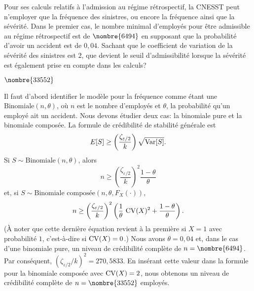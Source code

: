 \begin{exercice}
  Pour ses calculs relatifs à l'admission au régime rétrospectif, la
  CNESST peut n'employer que la fréquence des sinistres, ou encore la
  fréquence ainsi que la sévérité. Dans le premier cas, le nombre
  minimal d'employés pour être admissible au régime rétrospectif est
  de $\nombre{6494}$ en supposant que la probabilité d'avoir un accident
  est de $0,04$.  Sachant que le coefficient de variation de la sévérité
  des sinistres est $2$, que devient le seuil d'admissibilité
  lorsque la sévérité est également prise en compte dans les calculs?
  \begin{rep}
    $\nombre{33552}$
  \end{rep}
  \begin{sol}
    Il faut d'abord identifier le modèle pour la fréquence comme étant
    une $\text{Binomiale}(n, \theta)$, où $n$ est le nombre d'employés
    et $\theta$, la probabilité qu'un employé ait un accident. Nous
    devons étudier deux cas: la binomiale pure et la binomiale
    composée. La formule de crédibilité de stabilité générale est
    \begin{equation*}
      E [ S ] \geq
      \left(
        \frac{\zeta_{\varepsilon/2}}{k}
      \right) \sqrt{\operatorname{Var} [ S ]}.
    \end{equation*}
    Si $S \sim \text{Binomiale}(n, \theta)$, alors
    \begin{equation*}
      n \geq
      \left(
        \frac{\zeta_{\varepsilon/2}}{k}
      \right)^2 \frac{1 - \theta}{\theta}
    \end{equation*}
    et, si $S \sim \text{Binomiale composée}(n, \theta, F_X(\cdot))$,
    \begin{equation*}
      n \geq
      \left(
        \frac{\zeta_{\varepsilon/2}}{k}
      \right)^2
      \left(
        \frac{1}{\theta}\, \operatorname{CV}(X)^2 +
        \frac{1 - \theta}{\theta}
      \right).
    \end{equation*}
    (À noter que cette dernière équation revient à la première si
    $X = 1$ avec probabilité $1$, c'est-à-dire si $\operatorname{CV}(X) = 0$.) Nous
    avons $\theta = 0,04$ et, dans le cas d'une binomiale pure, un
    niveau de crédibilité complète de $n = \nombre{6494}$. Par
    conséquent, $(\zeta_{\varepsilon/2}/k)^2 = 270,5833$. En insérant
    cette valeur dans la formule pour la binomiale composée avec
    $\operatorname{CV}(X) = 2$, nous obtenons un niveau de crédibilité complète de
    $n = \nombre{33552}$ employés.
  \end{sol}
\end{exercice}

